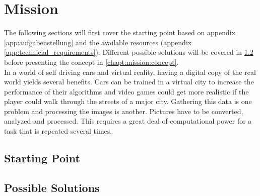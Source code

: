 %
%
\chapter{Mission} \label{chapt:mission}
The following sections will
first cover the starting point based on appendix \ref{app:aufgabenstellung} and the available resources (appendix \ref{app:technicial_requirements}). Different possible
solutions will be covered in \ref{chapt:solutions} before presenting the concept
in \ref{chapt:mission:concept}.
\\

In a world of self driving cars and virtual reality, having a digital copy of
the real world yields several benefits. Cars can be trained in a virtual city
to increase the performance of their algorithms and video games could get more
realistic if the player could walk through the streets of a major city. Gathering
this data is one problem and processing the images is another. Pictures have
to be converted, analyzed and processed. This requires a great deal of
computational power for a task that is repeated several times.

%
%
\section{Starting Point}

%
%
\section{Possible Solutions} \label{chapt:solutions}


%
%
\clearpage
